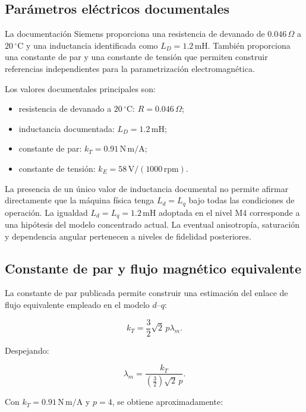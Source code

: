 \subsection{Parámetros eléctricos documentales}

La documentación Siemens proporciona una resistencia de devanado de $0.046\,\Omega$ a $20\,^{\circ}\mathrm{C}$ y una inductancia identificada como $L_D=1.2\,\mathrm{mH}$. También proporciona una constante de par y una constante de tensión que permiten construir referencias independientes para la parametrización electromagnética.

Los valores documentales principales son:

\begin{itemize}
    \item resistencia de devanado a $20\,^{\circ}\mathrm{C}$: $R=0.046\,\Omega$;
    \item inductancia documentada: $L_D=1.2\,\mathrm{mH}$;
    \item constante de par: $k_T=0.91\,\mathrm{N\,m/A}$;
    \item constante de tensión: $k_E=58\,\mathrm{V/(1000\,rpm)}$.
\end{itemize}

La presencia de un único valor de inductancia documental no permite afirmar directamente que la máquina física tenga $L_d=L_q$ bajo todas las condiciones de operación. La igualdad $L_d=L_q=1.2\,\mathrm{mH}$ adoptada en el nivel M4 corresponde a una hipótesis del modelo concentrado actual. La eventual anisotropía, saturación y dependencia angular pertenecen a niveles de fidelidad posteriores.

\subsection{Constante de par y flujo magnético equivalente}

La constante de par publicada permite construir una estimación del enlace de flujo equivalente empleado en el modelo $d$--$q$:

\begin{equation}
k_T=\frac{3}{2}\sqrt{2}\,p\lambda_m.
\end{equation}

Despejando:

\begin{equation}
\lambda_m=
\frac{k_T}{\left(\frac{3}{2}\right)\sqrt{2}\,p}.
\end{equation}

Con $k_T=0.91\,\mathrm{N\,m/A}$ y $p=4$, se obtiene aproximadamente:

